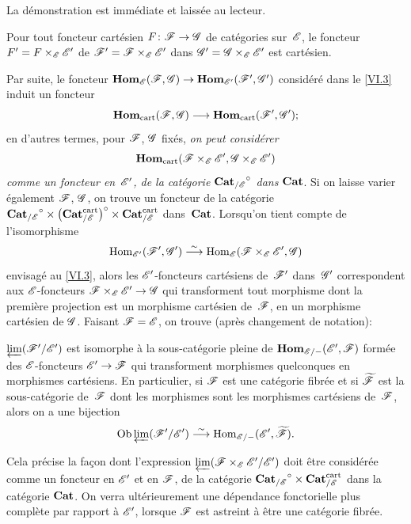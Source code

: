 La d\'emonstration est imm\'ediate et laiss\'ee au lecteur.

\begin{corollaire}
\label{VI.6.7}
Pour tout foncteur cart\'esien $F\colon \cal{F} \to \cal{G}$ de
cat\'egories sur~$\cal{E}$, le foncteur
$F'=F\times_{\cal{E}}\cal{E}'$ de
$\cal{F}'=\cal{F}\times_{\cal{E}}\cal{E}'$ dans
$\cal{G}'=\cal{G}\times_{\cal{E}}\cal{E}'$ est cart\'esien.
\end{corollaire}

Par suite, le foncteur $\SheafHom_{\cal{E}}(\cal{F},\cal{G}) \to
\SheafHom_{\cal{E}'}(\cal{F}',\cal{G}')$ consid\'er\'e dans
le
\No \ref{VI.3} induit un foncteur
$$
\SheafHom_\cart(\cal{F},\cal{G}) \to
\SheafHom_\cart(\cal{F}',\cal{G}') \rm{;}
$$
en d'autres termes, pour $\cal{F}$, $\cal{G}$ fix\'es, \emph{on peut
considérer}
$$
\SheafHom_\cart(\cal{F} \times_{\cal{E}} \cal{E}',
\cal{G}\times_{\cal{E}} \cal{E}')
$$
\emph{comme
un foncteur en~$\cal{E}'$, de la catégorie
${\Cat_{/\cal{E}}}^\circ$ dans $\mathbf{Cat}$}. Si on laisse varier
\'egalement $\cal{F}$, $\cal{G}$, on trouve
un foncteur de la cat\'egorie ${\Cat_{/\cal{E}}}^\circ \times \big(
\Cat^\cart_{/\cal{E}} \big)^\circ \times \Cat^\cart_{/\cal{E}}$
dans~$\mathbf{Cat}$. Lorsqu'on tient compte de l'isomorphisme
$$
\Hom_{\cal{E}'}(\cal{F}',\cal{G}') \isomto
\Hom_\cal{E}(\cal{F}\times_\cal{E}\cal{E}',\cal{G})
$$
envisag\'e au \No \ref{VI.3}, alors les $\cal{E}'$-foncteurs cart\'esiens
de~$\cal{F}'$ dans~$\cal{G}'$ correspondent aux $\cal{E}$-foncteurs
$\cal{F} \times_\cal{E} \cal{E}' \to \cal{G}$ qui transforment tout
morphisme dont la premi\`ere projection est un morphisme
cart\'esien de~$\cal{F}$, en un morphisme cart\'esien de
$\cal{G}$. Faisant $\cal{F}=\cal{E}$, on trouve (apr\`es changement
de notation):

\begin{corollaire}
\label{VI.6.8}
$\varprojLim(\cal{F}'/\cal{E}')$ est isomorphe \`a
la sous-cat\'egorie pleine de
$\SheafHom_{\cal{E}/-}(\cal{E}',\cal{F})$ form\'ee des
$\cal{E}$-foncteurs $\cal{E}'\to\cal{F}$ qui transforment morphismes
quelconques en morphismes cart\'esiens. En particulier, si $\cal{F}$
est une cat\'egorie fibr\'ee et si $\tilde{\cal{F}}$ est la
sous-cat\'egorie de~$\cal{F}$ dont les morphismes sont les
morphismes cart\'esiens de~$\cal{F}$, alors on a une bijection
$$
\Ob \varprojLim(\cal{F}'/\cal{E}') \isomto
\Hom_{\cal{E}/-}(\cal{E}',\tilde{\cal{F}}) \rm{.}
$$
\end{corollaire}

Cela pr\'ecise la fa\c con dont l'expression
$\varprojLim(\cal{F} \times_{\cal{E}} \cal{E}' /
\cal{E}')$ doit \^etre consid\'er\'ee comme un foncteur en
$\cal{E}'$ et en $\cal{F}$, de la cat\'egorie
${\Cat_{/\cal{E}}}^\circ \times \Cat^\cart_{/\cal{E}}$ dans la
cat\'egorie $\mathbf{Cat}$. On verra ult\'erieurement une d\'ependance
fonctorielle plus compl\`ete par rapport \`a $\cal{E}'$, lorsque
$\cal{F}$ est astreint \`a \^etre une cat\'egorie fibr\'ee.

